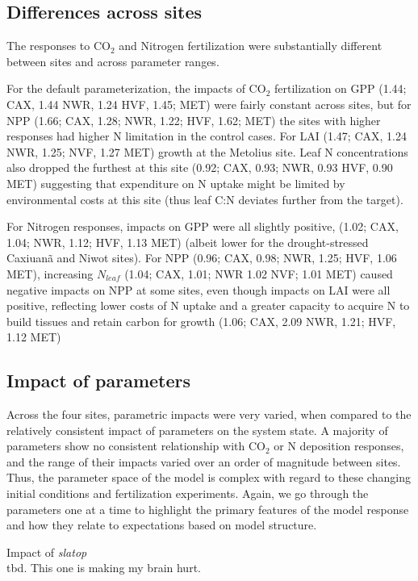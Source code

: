 \documentclass[draft,linenumbers]{agujournal}
\begin{document}
\subsection{Differences across sites}
The responses to CO$_{2}$ and Nitrogen fertilization were substantially different between sites and across parameter ranges. 

For the default parameterization, the impacts of CO$_{2}$ fertilization on  GPP (1.44; CAX, 1.44 NWR, 1.24 HVF, 1.45; MET) were fairly constant across sites, but for NPP (1.66; CAX, 1.28; NWR, 1.22; HVF, 1.62; MET) the sites with higher responses had higher N limitation in the control cases.  For LAI (1.47; CAX, 1.24 NWR, 1.25; NVF, 1.27 MET) growth at the Metolius site. Leaf N concentrations also dropped the furthest at this site (0.92; CAX, 0.93; NWR, 0.93 HVF, 0.90 MET) suggesting that expenditure on N uptake might be limited by environmental costs at this site (thus leaf C:N deviates further from the target). 

For Nitrogen responses, impacts on  GPP were all slightly positive, (1.02; CAX, 1.04; NWR, 1.12; HVF, 1.13 MET) (albeit lower for the drought-stressed Caxiuan\~a and Niwot sites).  For NPP (0.96; CAX, 0.98; NWR, 1.25; HVF, 1.06 MET), increasing $N_{leaf}$ (1.04; CAX, 1.01; NWR 1.02 NVF; 1.01 MET) caused negative impacts on NPP at some sites, even though impacts on LAI were all positive, reflecting lower costs of N uptake and a greater capacity to acquire N to build tissues and retain carbon for growth (1.06; CAX, 2.09 NWR, 1.21; HVF, 1.12 MET) 

\subsection{Impact of parameters}
Across the four sites, parametric impacts were very varied, when compared to the relatively consistent impact of parameters on the system state. A majority of parameters show no consistent relationship with CO$_{2}$ or N deposition responses, and the range of their impacts varied over an order of magnitude between sites. Thus, the parameter space of the model is complex with regard to these changing initial conditions and fertilization experiments. Again, we go through the parameters one at a time to highlight the primary features of the model response and how they relate to expectations based on model structure. 

Impact of \emph{slatop}\\
 tbd. This one is making my brain hurt. 
\end{document}
